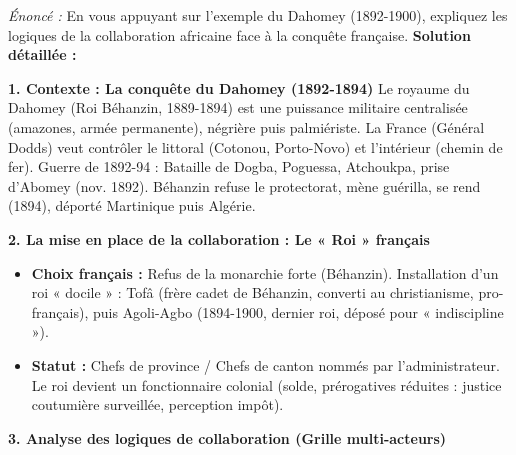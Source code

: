 \documentclass[11pt]{article}
\newcommand{\cle}[1]{{\popxbold\color{popdark}#1}}
\begin{document}
\begin{exoresolu}
\emph{Énoncé :} En vous appuyant sur l'exemple du Dahomey (1892-1900), expliquez les logiques de la collaboration africaine face à la conquête française.
\tcblower
\textbf{Solution détaillée :}

\textbf{1. Contexte : La conquête du Dahomey (1892-1894)}
Le royaume du \cle{Dahomey} (Roi \cle{Béhanzin}, 1889-1894) est une puissance militaire centralisée (amazones, armée permanente), négrière puis palmiériste. La France (Général \cle{Dodds}) veut contrôler le littoral (Cotonou, Porto-Novo) et l'intérieur (chemin de fer). Guerre de 1892-94 : \cle{Bataille de Dogba}, \cle{Poguessa}, \cle{Atchoukpa}, prise d'\cle{Abomey} (nov. 1892). Béhanzin refuse le protectorat, mène guérilla, se rend (1894), déporté Martinique puis Algérie.

\textbf{2. La mise en place de la collaboration : Le « Roi » français}
\begin{itemize}
    \item \textbf{Choix français :} Refus de la monarchie forte (Béhanzin). Installation d'un roi « docile » : \cle{Tofâ} (frère cadet de Béhanzin, converti au christianisme, pro-français), puis \cle{Agoli-Agbo} (1894-1900, dernier roi, déposé pour « indiscipline »).
    \item \textbf{Statut :} \cle{Chefs de province} / \cle{Chefs de canton} nommés par l'administrateur. Le roi devient un \cle{fonctionnaire colonial} (solde, prérogatives réduites : justice coutumière surveillée, perception impôt).
\end{itemize}

\textbf{3. Analyse des logiques de collaboration (Grille multi-acteurs)}


\end{exoresolu}
\end{document}
